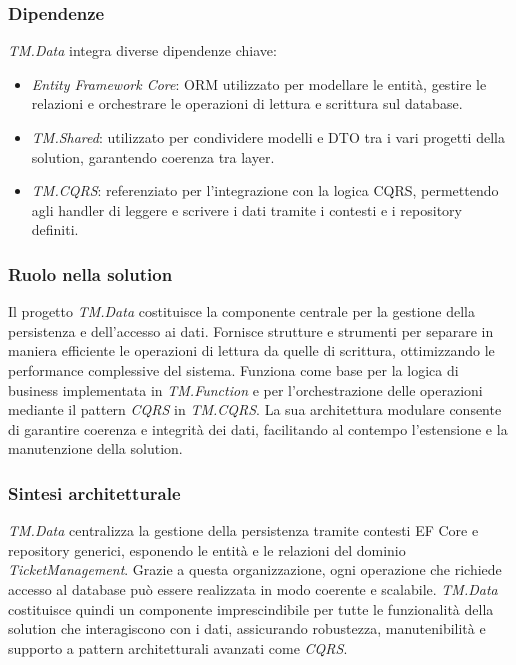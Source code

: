 \subsubsection{Dipendenze}
\textit{TM.Data} integra diverse dipendenze chiave:
\begin{itemize}
\item \textit{Entity Framework Core}: ORM utilizzato per modellare le entità, gestire le relazioni e orchestrare le operazioni di lettura e scrittura sul database.
\item \textit{TM.Shared}: utilizzato per condividere modelli e DTO tra i vari progetti della solution, garantendo coerenza tra layer.
\item \textit{TM.CQRS}: referenziato per l'integrazione con la logica CQRS, permettendo agli handler di leggere e scrivere i dati tramite i contesti e i repository definiti.
\end{itemize}

\subsubsection{Ruolo nella solution}
Il progetto \textit{TM.Data} costituisce la componente centrale per la gestione della persistenza e dell'accesso ai dati. Fornisce strutture e strumenti per separare in maniera efficiente le operazioni di lettura da quelle di scrittura, ottimizzando le performance complessive del sistema. Funziona come base per la logica di business implementata in \textit{TM.Function} e per l'orchestrazione delle operazioni mediante il pattern \textit{CQRS} in \textit{TM.CQRS}. La sua architettura modulare consente di garantire coerenza e integrità dei dati, facilitando al contempo l'estensione e la manutenzione della solution.

\subsubsection{Sintesi architetturale}
\textit{TM.Data} centralizza la gestione della persistenza tramite contesti EF Core e repository generici, esponendo le entità e le relazioni del dominio \textit{TicketManagement}. Grazie a questa organizzazione, ogni operazione che richiede accesso al database può essere realizzata in modo coerente e scalabile. \textit{TM.Data} costituisce quindi un componente imprescindibile per tutte le funzionalità della solution che interagiscono con i dati, assicurando robustezza, manutenibilità e supporto a pattern architetturali avanzati come \textit{CQRS}.

